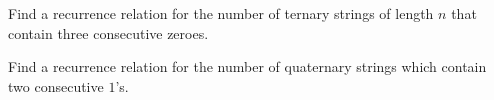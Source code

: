
\begin{prob}
Find a recurrence relation for the number of ternary strings of length $n$ that contain three consecutive zeroes.
\end{prob}
%
%
%
%
%


\begin{prob}
Find a recurrence relation for the number of quaternary strings which contain two consecutive $1$'s.
\end{prob}
%
%
%
%
%
%



